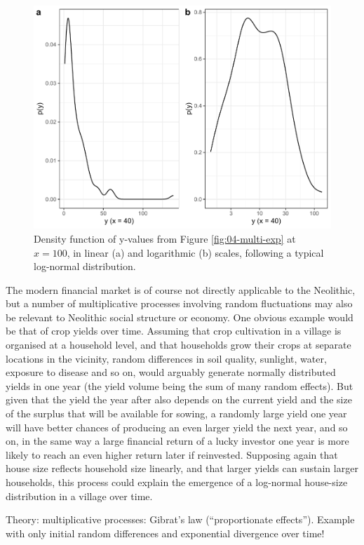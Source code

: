 \documentclass[
  12pt,
]{book}
\begin{document}
\begin{figure}

{\centering \includegraphics[width=0.7\linewidth]{bookdown-demo_files/figure-latex/04-lnorm-exp-1} 

}

\caption{Density function of y-values from Figure \ref{fig:04-multi-exp} at \(x = 100\), in linear (a) and logarithmic (b) scales, following a typical log-normal distribution.}\label{fig:04-lnorm-exp}
\end{figure}

The modern financial market is of course not directly applicable to the Neolithic, but a number of multiplicative processes involving random fluctuations may also be relevant to Neolithic social structure or economy. One obvious example would be that of crop yields over time. Assuming that crop cultivation in a village is organised at a household level, and that households grow their crops at separate locations in the vicinity, random differences in soil quality, sunlight, water, exposure to disease and so on, would arguably generate normally distributed yields in one year (the yield volume being the sum of many random effects). But given that the yield the year after also depends on the current yield and the size of the surplus that will be available for sowing, a randomly large yield one year will have better chances of producing an even larger yield the next year, and so on, in the same way a large financial return of a lucky investor one year is more likely to reach an even higher return later if reinvested. Supposing again that house size reflects household size linearly, and that larger yields can sustain larger households, this process could explain the emergence of a log-normal house-size distribution in a village over time.

Theory: multiplicative processes: Gibrat's law (``proportionate effects''). Example with only initial random differences and exponential divergence over time!
\end{document}
